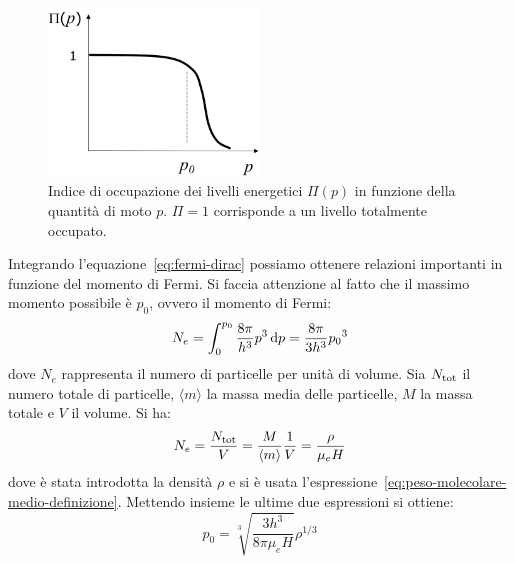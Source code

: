 \begin{figure}
\centering
\includegraphics[width=0.5\textwidth]{immagini/distribuzione-fermi.png}
\caption{Indice di occupazione dei livelli energetici $\Pi(p)$ in funzione della quantità di moto $p$. $\Pi = 1$ corrisponde a un livello totalmente occupato.}
\label{fig:distribuzione-fermi}
\end{figure}

Integrando l'equazione~\eqref{eq:fermi-dirac} possiamo ottenere relazioni importanti in funzione del momento di Fermi. Si faccia attenzione al fatto che il massimo momento possibile è $p_0$, ovvero il momento di Fermi:
\[
N_e = \int_0^{p_0} \frac{8 \pi}{h^3} p^3 \mathop{}\!\mathrm{d} p = \frac{8\pi}{3h^3} {p_0}^3
\]
dove $N_e$ rappresenta il numero di particelle per unità di volume. Sia $N_\textup{tot}$ il numero totale di particelle, $\langle m \rangle$ la massa media delle particelle, $M$ la massa totale e $V$ il volume. Si ha:
\[
N_e = \frac{N_\textup{tot}}{V} = \frac{M}{\langle m \rangle} \frac{1}{V} = \frac{\rho}{\mu_e H}
\]
dove è stata introdotta la densità $\rho$ e si è usata l'espressione~\eqref{eq:peso-molecolare-medio-definizione}.
Mettendo insieme le ultime due espressioni si ottiene:
\begin{equation}\label{eq:relazione-momento-fermi-densità}
    p_0 = \sqrt[3]{\dfrac{3h^3}{8\pi \mu_e H}} \rho^{1/3}
\end{equation}

